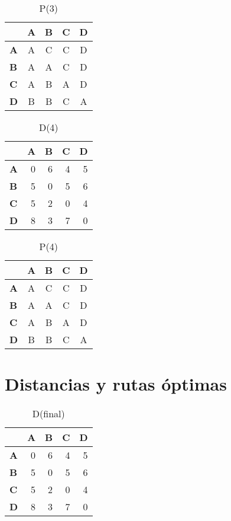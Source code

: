 \documentclass[11pt]{article}
\begin{document}
\begin{table}[H]\centering
\caption{P(3)}
\begin{tabular}{l c c c c}
\toprule
 & \textbf{A} & \textbf{B} & \textbf{C} & \textbf{D}\\\midrule
\textbf{A} & A & \cellcolor{yellow!30}C & C & D \\
\textbf{B} & A & A & C & D \\
\textbf{C} & A & B & A & D \\
\textbf{D} & B & B & C & A \\
\bottomrule
\end{tabular}
\end{table}

\begin{table}[H]\centering
\caption{D(4)}
\begin{tabular}{l r r r r}
\toprule
 & \textbf{A} & \textbf{B} & \textbf{C} & \textbf{D}\\\midrule
\textbf{A} & 0 & 6 & 4 & 5 \\
\textbf{B} & 5 & 0 & 5 & 6 \\
\textbf{C} & 5 & 2 & 0 & 4 \\
\textbf{D} & 8 & 3 & 7 & 0 \\
\bottomrule
\end{tabular}
\end{table}

\begin{table}[H]\centering
\caption{P(4)}
\begin{tabular}{l c c c c}
\toprule
 & \textbf{A} & \textbf{B} & \textbf{C} & \textbf{D}\\\midrule
\textbf{A} & A & C & C & D \\
\textbf{B} & A & A & C & D \\
\textbf{C} & A & B & A & D \\
\textbf{D} & B & B & C & A \\
\bottomrule
\end{tabular}
\end{table}

\section*{Distancias y rutas óptimas}
\begin{table}[H]\centering
\caption{D(final)}
\begin{tabular}{l r r r r}
\toprule
 & \textbf{A} & \textbf{B} & \textbf{C} & \textbf{D}\\\midrule
\textbf{A} & 0 & 6 & 4 & 5 \\
\textbf{B} & 5 & 0 & 5 & 6 \\
\textbf{C} & 5 & 2 & 0 & 4 \\
\textbf{D} & 8 & 3 & 7 & 0 \\
\bottomrule
\end{tabular}
\end{table}
\end{document}
